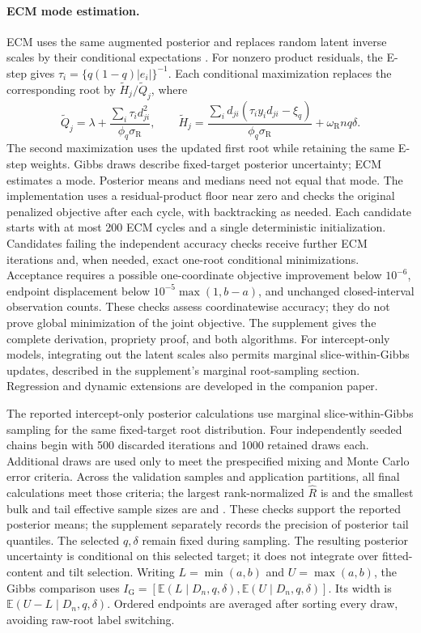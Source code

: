 \documentclass[11pt]{article}
\numberwithin{equation}{section}
\newcommand{\E}{\mathbb{E}}
\newcounter{algorithm}
\begin{document}
\paragraph{ECM mode estimation.}
ECM uses the same augmented posterior and replaces random latent inverse
scales by their conditional expectations
\citep{DempsterLairdRubin1977EM,MengRubin1993ECM}. For nonzero product residuals,
the E-step gives \(\tau_i=\{q(1-q)|e_i|\}^{-1}\). Each conditional
maximization replaces the corresponding root by
\(\widetilde H_j/\widetilde Q_j\), where
\[
\widetilde Q_j=\lambda+
\frac{\sum_i\tau_i d_{ji}^2}{\phi_q\sigma_{\mathrm R}},\qquad
\widetilde H_j=
\frac{\sum_i d_{ji}(\tau_i y_i d_{ji}-\xi_q)}{\phi_q\sigma_{\mathrm R}}
+\omega_{\mathrm R}nq\delta.
\]
The second maximization uses the updated first root while retaining the
same E-step weights. Gibbs draws describe fixed-target posterior uncertainty;
ECM estimates a mode. Posterior means and medians need not equal that mode.
The implementation uses a residual-product floor near zero and checks the
original penalized objective after each cycle, with backtracking as needed.
Each candidate starts with at most 200 ECM cycles and a single deterministic
initialization. Candidates failing the independent accuracy checks receive
further ECM iterations and, when needed, exact one-root conditional
minimizations. Acceptance requires a possible one-coordinate objective
improvement below \(10^{-6}\), endpoint displacement below
\(10^{-5}\max(1,b-a)\), and unchanged closed-interval observation counts.
These checks assess coordinatewise accuracy; they do not prove global
minimization of the joint objective.
The supplement gives the complete derivation, propriety proof, and both
algorithms. For intercept-only models, integrating out the latent scales
also permits marginal slice-within-Gibbs updates, described in the
supplement's marginal root-sampling section. Regression and dynamic
extensions are developed in the companion paper.

The reported intercept-only posterior calculations use marginal
slice-within-Gibbs sampling for the same fixed-target root distribution.
Four independently seeded chains begin with 500 discarded iterations and
1000 retained draws each. Additional draws are used only to meet the
prespecified mixing and Monte Carlo error criteria. Across the
\MTIGibbsExpandedSamples{} validation samples and \MTIFullApplications{}
application partitions, all final calculations meet those criteria; the
largest rank-normalized \(\widehat R\) is \MTIGibbsAllRhat{} and the smallest
bulk and tail effective sample sizes are \MTIGibbsAllBulkESS{} and
\MTIGibbsAllTailESS{} \citep{VehtariEtAl2021Rhat}.
These checks support the reported posterior means; the supplement separately
records the precision of posterior tail quantiles. The selected \(q,\delta\) remain fixed during sampling.
The resulting posterior uncertainty is conditional on this selected target;
it does not integrate over fitted-content and tilt selection.
Writing \(L=\min(a,b)\) and \(U=\max(a,b)\), the Gibbs comparison uses
\(I_{\mathrm G}=[\E(L\mid D_n,q,\delta),\E(U\mid D_n,q,\delta)]\).
Its width is \(\E(U-L\mid D_n,q,\delta)\). Ordered endpoints are averaged
after sorting every draw, avoiding raw-root label switching.
\end{document}
